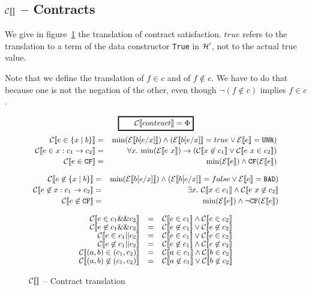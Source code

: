 \documentclass[preprint]{sigplanconf}
\begin{document}
\subsection{$\ctrans{}$ -- Contracts}
We give in figure~\ref{ctrans} the translation of contract satisfaction.
$true$ refers to the translation to a term of the data constructor
\texttt{True} in $\hprime$, not to the actual true value.

Note that we define the translation of $f \in c$ and of $f \not \in
c$. We have to do that because one is not the negation of the other,
even though $\lnot (f \not \in c)$ implies $f \in c$.

\begin{figure}
  $$ \ruleform{\ctrans{contract} = \Phi} $$
\begin{eqnarray*}
  \ctrans{e \in \{x \mid b \}} &=&  \min{\etrans{b[e/x]}} \land (\etrans{b[e/x]} = true \lor \etrans{e} = \unr)\\
  \ctrans{e \in x:c_1 \to c_2} &=& \forall x.~\min{\etrans{e~x}} \to (\ctrans{x \not \in c_1} \lor  \ctrans{e~x \in c_2})\\
  \ctrans{e \in \cfc} &=& \min{\etrans{e}} \land \cf{\etrans{e}}
\end{eqnarray*}

\begin{eqnarray*}
  \ctrans{e \not \in \{x \mid b \}} &=&  \min{\etrans{b[e/x]}} \land (\etrans{b[e/x]} = false \lor \etrans{e} = \bad)\\
  \ctrans{e \not \in x:c_1 \to c_2} &=& \exists x.~ \ctrans{x \in c_1} \land  \ctrans{e~x \not \in c_2}\\
  \ctrans{e \not \in \cfc} &=& \min{\etrans{e}} \land \lnot \cf{\etrans{e}}
\end{eqnarray*}

\begin{center}
\[  \begin{array}{rcl}
 \ctrans{e \in c_1 \&\& c_2} &=& \ctrans{e \in c_1} \land \ctrans{e \in c_2} \\
 \ctrans{e \not \in c_1 \&\& c_2} &=& \ctrans{e \not \in c_1} \lor \ctrans{e \not \in c_2}\\
 \ctrans{e \in c_1 || c_2} &=& \ctrans{e \in c_1} \lor \ctrans{e \in c_2} \\
  \ctrans{e \not \in c_1 || c_2} &=& \ctrans{e \not \in c_1} \land \ctrans{e \not \in c_2}\\
 \ctrans{(a,b) \in (c_1,c_2)}   &=& \ctrans{a \in c_1} \land \ctrans{b \in c_2} \\
 \ctrans{(a,b) \not \in (c_1,c_2)}   &=& \ctrans{a \not \in c_1} \lor \ctrans{b \not \in c_2} \\
\end{array} \]
\end{center}

\caption{$\ctrans{}$ -- Contract translation}
\label{ctrans}
\end{figure}
\end{document}
